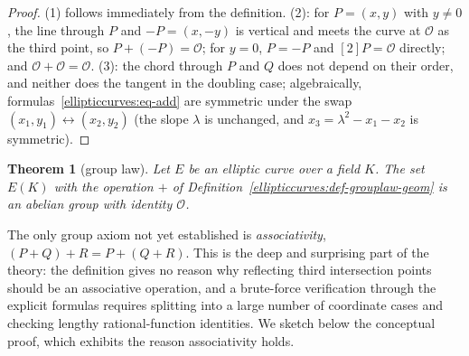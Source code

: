 \documentclass[11pt,a4paper]{article}
\newtheorem{theorem}{Theorem}[section]
\theoremstyle{definition}
\theoremstyle{remark}
\begin{document}
\begin{proof}
(1) follows immediately from the definition. (2): for \(P = (x,y)\) with \(y \neq 0\), the line through \(P\) and \(-P = (x,-y)\) is vertical and meets the curve at \(\mathcal{O}\) as the third point, so \(P + (-P) = \mathcal{O}\); for \(y = 0\), \(P = -P\) and \([2]P = \mathcal{O}\) directly; and \(\mathcal{O} + \mathcal{O} = \mathcal{O}\). (3): the chord through \(P\) and \(Q\) does not depend on their order, and neither does the tangent in the doubling case; algebraically, formulas~\eqref{ellipticcurves:eq-add} are symmetric under the swap \((x_1,y_1) \leftrightarrow (x_2,y_2)\) (the slope \(\lambda\) is unchanged, and \(x_3 = \lambda^2 - x_1 - x_2\) is symmetric).
\end{proof}

\begin{theorem}[group law]\label{ellipticcurves:thm-grouplaw}
Let \(E\) be an elliptic curve over a field \(K\). The set \(E(K)\) with the operation \(+\) of Definition~\ref{ellipticcurves:def-grouplaw-geom} is an abelian group with identity \(\mathcal{O}\).
\end{theorem}

The only group axiom not yet established is \emph{associativity}, \((P + Q) + R = P + (Q + R)\). This is the deep and surprising part of the theory: the definition gives no reason why reflecting third intersection points should be an associative operation, and a brute-force verification through the explicit formulas requires splitting into a large number of coordinate cases and checking lengthy rational-function identities. We sketch below the conceptual proof, which exhibits the reason associativity holds.
\end{document}
